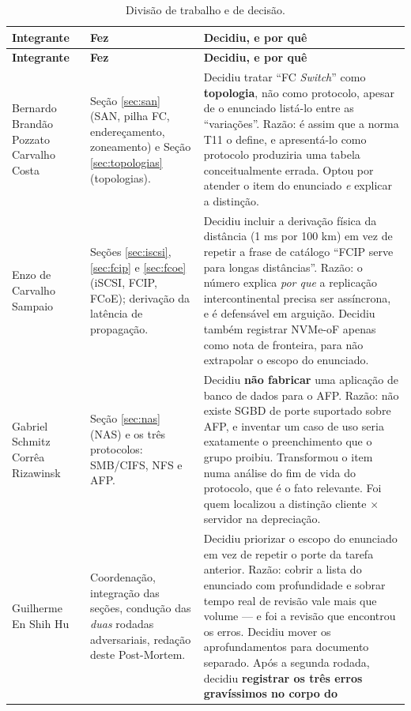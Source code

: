 \documentclass[11pt,a4paper]{article}
\begin{document}
{\footnotesize
\begin{longtable}{@{}p{3.7cm}p{4.3cm}p{6.3cm}@{}}
\caption{Divisão de trabalho e de decisão.}\label{tab:autoria}\\
\toprule
\textbf{Integrante} & \textbf{Fez} & \textbf{Decidiu, e por quê} \\
\midrule\endfirsthead
\toprule
\textbf{Integrante} & \textbf{Fez} & \textbf{Decidiu, e por quê} \\
\midrule\endhead
Bernardo Brandão Pozzato Carvalho Costa &
Seção \ref{sec:san} (SAN, pilha FC, endereçamento, zoneamento) e Seção \ref{sec:topologias}
(topologias). &
Decidiu tratar ``FC \textit{Switch}'' como \textbf{topologia}, não como protocolo, apesar de o
enunciado listá-lo entre as ``variações''. Razão: é assim que a norma T11 o define, e apresentá-lo
como protocolo produziria uma tabela conceitualmente errada. Optou por atender o item do enunciado
\emph{e} explicar a distinção. \\
\addlinespace
Enzo de Carvalho Sampaio &
Seções \ref{sec:iscsi}, \ref{sec:fcip} e \ref{sec:fcoe} (iSCSI, FCIP, FCoE); derivação da latência
de propagação. &
Decidiu incluir a derivação física da distância (1 ms por 100 km) em vez de repetir a frase de
catálogo ``FCIP serve para longas distâncias''. Razão: o número explica \emph{por que} a replicação
intercontinental precisa ser assíncrona, e é defensável em arguição. Decidiu também registrar
NVMe-oF apenas como nota de fronteira, para não extrapolar o escopo do enunciado. \\
\addlinespace
Gabriel Schmitz Corrêa Rizawinsk &
Seção \ref{sec:nas} (NAS) e os três protocolos: SMB/CIFS, NFS e AFP. &
Decidiu \textbf{não fabricar} uma aplicação de banco de dados para o AFP. Razão: não existe SGBD de
porte suportado sobre AFP, e inventar um caso de uso seria exatamente o preenchimento que o grupo
proibiu. Transformou o item numa análise do fim de vida do protocolo, que é o fato relevante. Foi
quem localizou a distinção cliente $\times$ servidor na depreciação. \\
\addlinespace
Guilherme En Shih Hu &
Coordenação, integração das seções, condução das \emph{duas} rodadas adversariais, redação deste
Post-Mortem. &
Decidiu priorizar o escopo do enunciado em vez de repetir o porte da tarefa
anterior. Razão: cobrir a lista do enunciado com profundidade e sobrar tempo real de revisão vale
mais que volume --- e foi a revisão que encontrou os erros. Decidiu mover os aprofundamentos para documento
separado. Após a segunda rodada, decidiu \textbf{registrar os três erros gravíssimos no corpo do
}
\end{longtable}}
\end{document}

